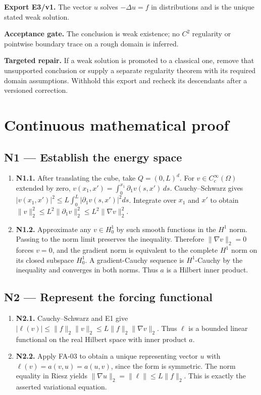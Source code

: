 \documentclass[preprint,12pt,aps,pra,showkeys,amsmath,amssymb,superscriptaddress,floatfix]{revtex4-2}
\theoremstyle{definition}
\theoremstyle{remark}
\newcommand{\field}[2]{\par\smallskip\noindent\textbf{#1.} #2\par}
\begin{document}
\field{Export E3/v1}{The vector \(u\) solves \(-\Delta u=f\) in distributions and is the
unique stated weak solution.}

\field{Acceptance gate}{The conclusion is weak existence; no \(C^2\) regularity or pointwise
boundary trace on a rough domain is inferred.}

\field{Targeted repair}{If a weak solution is promoted to a classical one, remove that
unsupported conclusion or supply a separate regularity theorem with its
required domain assumptions. Withhold this export and recheck its
descendants after a versioned correction.}

\endgroup\clearpage\section{Continuous mathematical proof}\label{sec:proof}

\subsection{N1 --- Establish the energy
space}\label{n1-establish-the-energy-space}

\begin{enumerate}
\def\labelenumi{\arabic{enumi}.}
\item
  \textbf{N1.1.} After translating the cube, take \(Q=(0,L)^d\). For
  \(v\in C_c^\infty(\Omega)\) extended by zero,
  \(v(x_1,x')=\int_0^{x_1}\partial_1v(s,x')\,ds\). Cauchy--Schwarz gives
  \(|v(x_1,x')|^2\le L\int_0^L|\partial_1v(s,x')|^2ds\). Integrate over
  \(x_1\) and \(x'\) to obtain
  \(\|v\|_2^2\le L^2\|\partial_1v\|_2^2\le L^2\|\nabla v\|_2^2\).
\item
  \textbf{N1.2.} Approximate any \(v\in H_0^1\) by such smooth functions
  in the \(H^1\) norm. Passing to the norm limit preserves the
  inequality. Therefore \(\|\nabla v\|_2=0\) forces \(v=0\), and the
  gradient norm is equivalent to the complete \(H^1\) norm on its closed
  subspace \(H_0^1\). A gradient-Cauchy sequence is \(H^1\)-Cauchy by
  the inequality and converges in both norms. Thus \(a\) is a Hilbert
  inner product.
\end{enumerate}

\subsection{N2 --- Represent the forcing
functional}\label{n2-represent-the-forcing-functional}

\begin{enumerate}
\def\labelenumi{\arabic{enumi}.}
\item
  \textbf{N2.1.} Cauchy--Schwarz and E1 give
  \(|\ell(v)|\le\|f\|_2\|v\|_2\le L\|f\|_2\|\nabla v\|_2\). Thus
  \(\ell\) is a bounded linear functional on the real Hilbert space with
  inner product \(a\).
\item
  \textbf{N2.2.} Apply FA-03 to obtain a unique representing vector
  \(u\) with \(\ell(v)=a(v,u)=a(u,v)\), since the form is symmetric. The
  norm equality in Riesz yields \(\|\nabla u\|_2=\|\ell\|\le L\|f\|_2\).
  This is exactly the asserted variational equation.
\end{enumerate}
\end{document}
